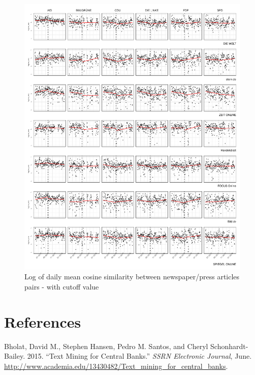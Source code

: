 \documentclass[
]{article}
\begin{document}
\begin{figure}

{\centering \includegraphics[width=1\linewidth]{main_text_files/figure-latex/Daily mean cosine similarity - cutoff value-1} 

}

\caption{Log of daily mean cosine similarity between newspaper/press articles pairs - with cutoff value \label{fig:mean_cosine_sim_rd}}\label{fig:Daily mean cosine similarity - cutoff value}
\end{figure}

\newpage

\hypertarget{references}{%
\section*{References}\label{references}}

\hypertarget{refs}{}
\leavevmode\hypertarget{ref-bholat_text_2015}{}%
Bholat, David M., Stephen Hansen, Pedro M. Santos, and Cheryl
Schonhardt-Bailey. 2015. ``Text Mining for Central Banks.'' \emph{SSRN
Electronic Journal}, June.
\url{http://www.academia.edu/13430482/Text_mining_for_central_banks}.
\end{document}
